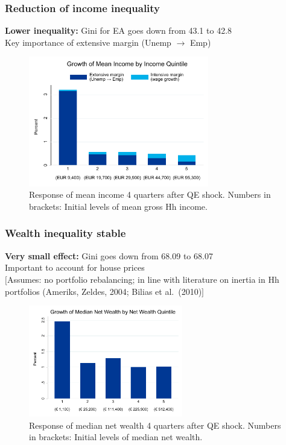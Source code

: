 \documentclass[pdflatex,aspectratio=169]{beamer}
\newcommand{\jemph}[1]{{\color{StataDarkBlue}#1}}
\newcommand{\jbemph}[1]{\textbf{\color{SlideNavy}#1}}
\begin{document}
\begin{frame}\frametitle{\bf Reduction of income inequality}
\jbemph{Lower inequality:} Gini for EA goes down from 43.1 to 42.8\\
\jemph{Key importance of extensive margin (Unemp ${}\rightarrow{}$ Emp)}
\begin{figure}
\begin{center}
\includegraphics[width=0.7\textwidth]{./figures/meanIncomeByIncQuint_EA_decomp_per4}\\[-2mm]
{\tiny Response of mean income 4 quarters after QE shock. Numbers in brackets: Initial levels of mean gross Hh income. }
\end{center}
\end{figure}

\end{frame}

\begin{frame}\frametitle{\bf Wealth inequality stable \hypertarget{WealthIneq}{}}
\jbemph{Very small effect:} Gini goes down from 68.09 to 68.07\\
\hspace*{32mm}Important to account for house prices \hyperlink{WealthDecomp}{}\\
{\scriptsize $[$Assumes: \jemph{no portfolio rebalancing;} in line with literature on inertia in Hh portfolios (Ameriks, Zeldes, 2004; Bilias et al.\ (2010)$]$}
\begin{figure}
\begin{center}
\includegraphics[width=0.6\textwidth]{./figures/medianNetWealthByWquint_EA}\\[-2mm]
{\tiny Response of median net wealth 4 quarters after QE shock. Numbers in brackets: Initial levels of median net wealth.
}
\end{center}
\end{figure}
\end{frame}
\end{document}

